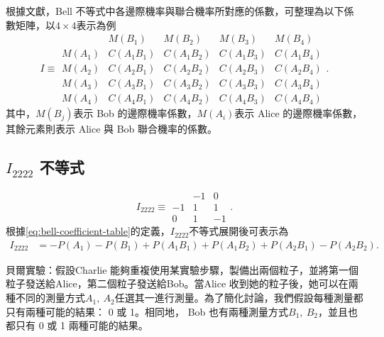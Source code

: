 \documentclass[12pt, a4paper, twoside, reqno]{article}
\begin{document}
\indent 根據文獻\cite{Brunner2008}，Bell 不等式中各邊際機率與聯合機率所對應的係數，可整理為以下係數矩陣，以$4\times4$表示為例
\begin{equation}
I
\equiv
\begin{array}{c|cccc}
    & M(B_1) & M(B_2) & M(B_3) & M(B_4)\\
    \hline
    M(A_1)
    & C(A_1B_1) & C(A_1B_2) & C(A_1B_3) & C(A_1B_4)\\
    M(A_2)
    & C(A_2B_1) & C(A_2B_2) & C(A_2B_3) & C(A_2B_4)\\
    M(A_3)
    & C(A_3B_1) & C(A_3B_2) & C(A_3B_3) & C(A_3B_4)\\
    M(A_4)
    & C(A_4B_1) & C(A_4B_2) & C(A_4B_3) & C(A_4B_4)
\end{array}.
\label{eq:bell-coefficient-table}
\end{equation}
\noindent 其中，$M(B_j)$表示 Bob 的邊際機率係數，$M(A_i)$表示 Alice 的邊際機率係數，其餘元素則表示 Alice 與 Bob 聯合機率的係數。


\subsection{\texorpdfstring{$I_{2222}$}{I2222} 不等式}
\begin{equation}
I_{2222}
\equiv
\begin{array}{c|cc}
    & -1 & 0\\
    \hline
    -1 & 1 & 1\\
    0 & 1 & -1
\end{array}.
\label{eq:I2222-table}
\end{equation}
\noindent 根據\eqref{eq:bell-coefficient-table}的定義，$I_{2222}$不等式展開後可表示為
\begin{equation}
\begin{aligned}
    I_{2222}
    &=-P(A_1)-P(B_1)+P(A_1B_1)+P(A_1B_2)+P(A_2B_1)-P(A_2B_2).
\end{aligned}
\label{eq:I2222-inequality}
\end{equation}

\indent 貝爾實驗：假設Charlie 能夠重複使用某實驗步驟，製備出兩個粒子，並將第一個粒子發送給Alice，第二個粒子發送給Bob。當Alice 收到她的粒子後，她可以在兩種不同的測量方式$A_1,~A_2$任選其一進行測量。為了簡化討論，我們假設每種測量都只有兩種可能的結果： 0 或 1。相同地， Bob 也有兩種測量方式$B_1,~B_2$，並且也都只有 0 或 1 兩種可能的結果。
\end{document}
